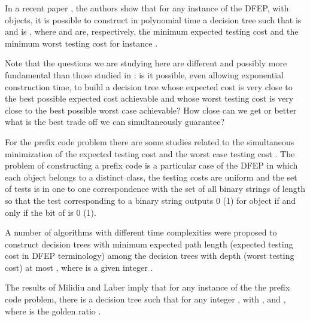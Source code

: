 \documentclass{llncs}
\begin{document}
In a recent paper \cite{labericml}, the authors
show  that for any instance  of the
DFEP, with  objects, it is possible to construct in polynomial time a decision tree
 such that  is 
and  is ,
where  and  are,
respectively, the minimum expected  testing cost
and the minimum worst testing cost for instance . 

Note that the questions we are studying here are different and possibly more fundamental than those studied in \cite{labericml}: is it possible, even
allowing exponential construction time, to build a decision tree whose expected cost is very close to the best possible expected cost achievable
and whose worst testing cost is very close to the best possible worst case achievable? How close can we get or better what is the best trade off
we can simultaneously guarantee?




For the prefix code problem
there are some studies related to the  simultaneous minimization
of  the expected testing cost and the worst case testing cost \cite{garey,larmore,fastalg,laber}.
The problem of constructing a prefix code 
is a particular case of the DFEP in which each object belongs to a distinct class, the testing costs are uniform 
and the set of tests is in one to one correspondence with the set of all binary
strings of length  so that the test corresponding to a binary
string  outputs 0 (1) for object  if and only if the
 bit of  is 0 (1).

A number of algorithms with different  time complexities
were proposed to 
construct  decision trees with minimum expected path length (expected testing cost in DFEP terminology)
among the decision trees with depth (worst testing cost) at most ,
where  is a given integer \cite{garey,larmore,fastalg}.

The results of Milidiu and Laber \cite{laber} imply
that for any instance   of the the prefix code problem,
 there is a decision tree  such that for any integer  ,
with ,
 and
,
where  is the golden ratio .










 
\end{document}
